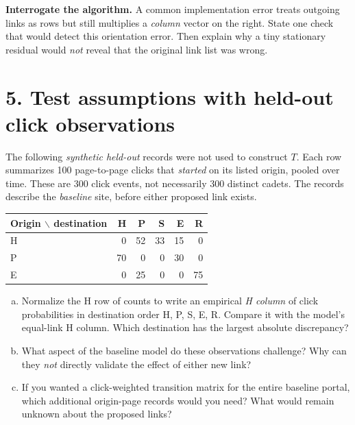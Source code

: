 \documentclass[10pt,letterpaper]{article}
\begin{document}
\textbf{Interrogate the algorithm.} A common implementation error treats outgoing links as rows but still multiplies a \emph{column} vector on the right. State one check that would detect this orientation error. Then explain why a tiny stationary residual would \emph{not} reveal that the original link list was wrong.\\[0.58in]

\newpage

\section*{5. Test assumptions with held-out click observations}
The following \emph{synthetic held-out} records were not used to construct $T$. Each row summarizes 100 page-to-page clicks that \emph{started} on its listed origin, pooled over time. These are 300 click events, not necessarily 300 distinct cadets. The records describe the \emph{baseline} site, before either proposed link exists.
\begin{center}
\begin{tabular}{@{}lrrrrr@{}}
\toprule
Origin $\backslash$ destination & H & P & S & E & R\\
\midrule
H & 0 & 52 & 33 & 15 & 0\\
P & 70 & 0 & 0 & 30 & 0\\
E & 0 & 25 & 0 & 0 & 75\\
\bottomrule
\end{tabular}
\end{center}
\begin{enumerate}[a.,leftmargin=*]
\item Normalize the H row of counts to write an empirical \emph{H column} of click probabilities in destination order H, P, S, E, R. Compare it with the model's equal-link H column. Which destination has the largest absolute discrepancy?\\[0.56in]
\item What aspect of the baseline model do these observations challenge? Why can they \emph{not} directly validate the effect of either new link?\\[0.49in]
\item If you wanted a click-weighted transition matrix for the entire baseline portal, which additional origin-page records would you need? What would remain unknown about the proposed links?\\[0.46in]
\end{enumerate}
\newpage
\end{document}
